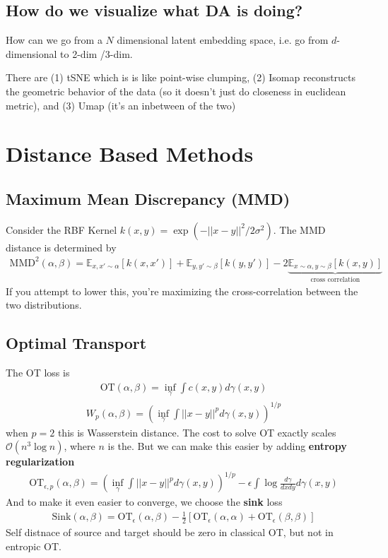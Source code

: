 \subsection{How do we visualize what DA is doing?}
How can we go from a $N$ dimensional latent embedding space, i.e. go from $d$-dimensional to 2-dim /3-dim.

There are (1) tSNE which is is like point-wise clumping, (2) Isomap reconstructs the geometric behavior of the data (so it doesn't just do closeness in euclidean metric), and (3) Umap (it's an inbetween of the two)


\section{Distance Based Methods}
\subsection{Maximum Mean Discrepancy (MMD)}
Consider the RBF Kernel $k(x,y) = \exp( - ||x-y||^2 / 2\sigma^2)$. The MMD distance is determined by
\begin{align}
	\text{MMD}^2(\alpha, \beta) = \mathbb E_{x,x' \sim \alpha} [k (x,x')] + \mathbb E_{y,y' \sim \beta} [k(y,y')] - 2 \underbrace{\mathbb E_{x \sim \alpha, y \sim \beta}[k(x,y)]}_{\text{cross correlation}}
\end{align}
If you attempt to lower this, you're maximizing the cross-correlation between the two distributions.


\subsection{Optimal Transport}
The OT loss is
\begin{align}
	\text{OT}(\alpha,\beta) = \inf_\gamma \int c(x,y) d\gamma(x,y)
\end{align}
\begin{align}
	W_p(\alpha,\beta) = \left(\inf_\gamma \int ||x-y||^p d\gamma(x,y) \right)^{1/p}
\end{align}
when $p=2$ this is Wasserstein distance. The cost to solve OT exactly scales $\mathcal O(n^3 \log n)$, where $n$ is the. But we can make this easier by adding \textbf{entropy regularization}
\begin{align}
	\text{OT}_{\epsilon, p}(\alpha,\beta) = \left(\inf_\gamma \int ||x-y||^p d\gamma(x,y) \right)^{1/p} - \epsilon \int \log \frac{d\gamma}{dx dy} d\gamma(x,y)
\end{align}
And to make it even easier to converge, we choose the \textbf{sink} loss
\begin{align}
	\text{Sink}(\alpha, \beta) = \text{OT}_\epsilon(\alpha, \beta) - \frac{1}{2} [\text{OT}_\epsilon (\alpha, \alpha) + \text{OT}_\epsilon (\beta,\beta)]
\end{align}
Self distnace of source and target should be zero in classical OT, but not in entropic OT.

